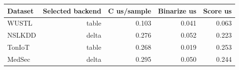 \begin{tabular}{lrrrr}
\toprule
Dataset & Selected backend & C us/sample & Binarize us & Score us \\
\midrule
WUSTL & table & 0.103 & 0.041 & 0.063 \\
NSLKDD & delta & 0.276 & 0.052 & 0.223 \\
TonIoT & table & 0.268 & 0.019 & 0.253 \\
MedSec & delta & 0.295 & 0.050 & 0.244 \\
\bottomrule
\end{tabular}

